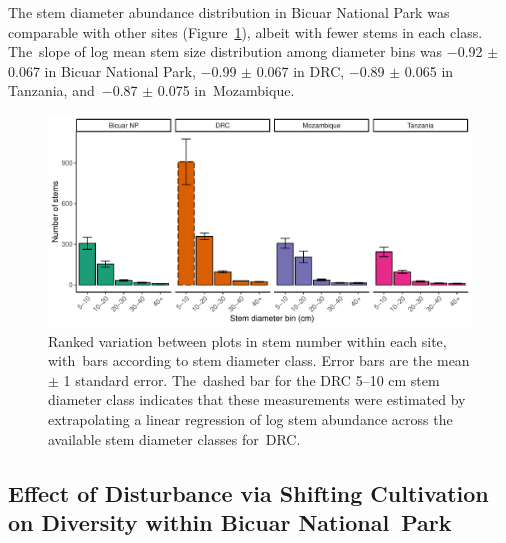 \documentclass[diversity,article,accept,moreauthors,pdftex]{Definitions/mdpi}
\newcommand{\dbhslopebicuar}{$-$0.92 $\pm$ 0.067}
\newcommand{\dbhslopedrc}{$-$0.99 $\pm$ 0.067}
\newcommand{\dbhslopenham}{$-$0.87 $\pm$ 0.075}
\newcommand{\dbhslopekilwa}{$-$0.89 $\pm$ 0.065}
\begin{document}
The stem diameter abundance distribution in Bicuar National Park was comparable with other sites (Figure~\ref{stem_ab_dbh_bin}), albeit with fewer stems in each class. The~slope of log mean stem size distribution among diameter bins was \dbhslopebicuar{} in Bicuar National Park, \dbhslopedrc{} in DRC, \dbhslopekilwa{} in Tanzania, and~\dbhslopenham{} in~Mozambique.  

\begin{figure}[H]
\centering
	\includegraphics[width=\textwidth]{img/stem_ab_dbh_bin_group}
	\caption{Ranked variation between plots in stem number within each site, with~bars according to stem diameter class. Error bars are the mean $\pm$ 1 standard error. The~dashed bar for the DRC 5--10 cm stem diameter class indicates that these measurements were estimated by extrapolating a linear regression of log stem abundance across the available stem diameter classes for~DRC.}
	\label{stem_ab_dbh_bin}
\end{figure}
\unskip

\subsection{Effect of Disturbance via Shifting Cultivation on Diversity within Bicuar National~Park}
\end{document}
